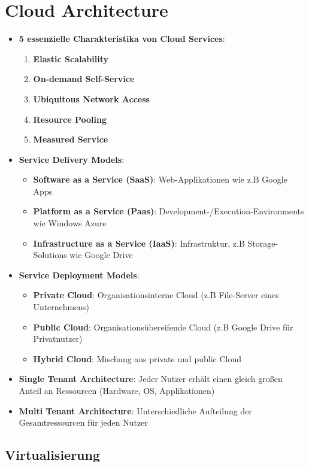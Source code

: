 \section{Cloud Architecture}
\label{cla:sec:cloud_architecture}

\begin{itemize}
	\item \textbf{5 essenzielle Charakteristika von Cloud Services}:
	\begin{enumerate}
		\item \textbf{Elastic Scalability}
		\item \textbf{On-demand Self-Service}
		\item \textbf{Ubiquitous Network Access}
		\item \textbf{Resource Pooling}
		\item \textbf{Measured Service}
	\end{enumerate}
	\item \textbf{Service Delivery Models}:
	\begin{itemize}
		\item \textbf{Software as a Service (SaaS)}: Web-Applikationen wie z.B Google Apps
		\item \textbf{Platform as a Service (Paas)}: Development-/Execution-Environments wie Windows Azure
		\item \textbf{Infrastructure as a Service (IaaS)}: Infrastruktur, z.B Storage-Solutions wie Google Drive
	\end{itemize}
	\item \textbf{Service Deployment Models}:
	\begin{itemize}
		\item \textbf{Private Cloud}: Organisationsinterne Cloud (z.B File-Server eines Unternehmens)
		\item \textbf{Public Cloud}: Organisationsübereifende Cloud (z.B Google Drive für Privatnutzer)
		\item \textbf{Hybrid Cloud}: Mischung aus private und public Cloud
	\end{itemize}
	\item \textbf{Single Tenant Architecture}: Jeder Nutzer erhält einen gleich großen Anteil an Ressourcen (Hardware, OS, Applikationen)
	\item \textbf{Multi Tenant Architecture}: Unterschiedliche Aufteilung der Gesamtressourcen für jeden Nutzer
\end{itemize}

\subsection{Virtualisierung}
\label{cla:sub:virtualisierung}

